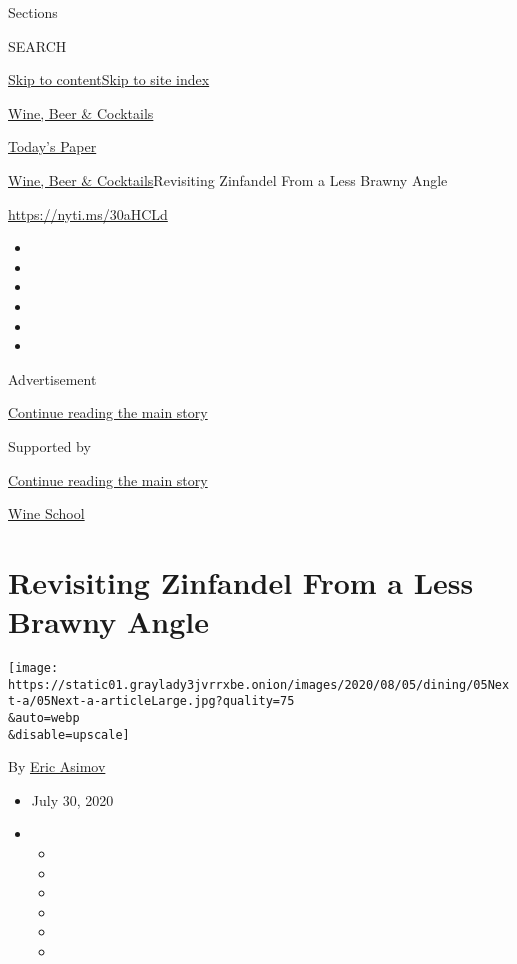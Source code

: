 Sections

SEARCH

\protect\hyperlink{site-content}{Skip to
content}\protect\hyperlink{site-index}{Skip to site index}

\href{https://www.nytimes3xbfgragh.onion/section/food/drinks}{Wine, Beer
\& Cocktails}

\href{https://myaccount.nytimes3xbfgragh.onion/auth/login?response_type=cookie\&client_id=vi}{}

\href{https://www.nytimes3xbfgragh.onion/section/todayspaper}{Today's
Paper}

\href{/section/food/drinks}{Wine, Beer \& Cocktails}\textbar{}Revisiting
Zinfandel From a Less Brawny Angle

\url{https://nyti.ms/30aHCLd}

\begin{itemize}
\item
\item
\item
\item
\item
\item
\end{itemize}

Advertisement

\protect\hyperlink{after-top}{Continue reading the main story}

Supported by

\protect\hyperlink{after-sponsor}{Continue reading the main story}

\href{/column/wine-school}{Wine School}

\hypertarget{revisiting-zinfandel-from-a-less-brawny-angle}{%
\section{Revisiting Zinfandel From a Less Brawny
Angle}\label{revisiting-zinfandel-from-a-less-brawny-angle}}

\texttt{[image: https://static01.graylady3jvrrxbe.onion/images/2020/08/05/dining/05Next-a/05Next-a-articleLarge.jpg?quality=75\\\&auto=webp\\\&disable=upscale]}

By \href{https://www.nytimes3xbfgragh.onion/by/eric-asimov}{Eric Asimov}

\begin{itemize}
\item
  July 30, 2020
\item
  \begin{itemize}
  \item
  \item
  \item
  \item
  \item
  \item
  \end{itemize}
\end{itemize}


